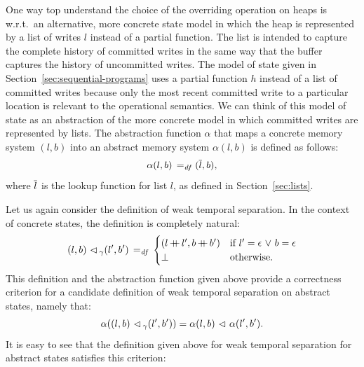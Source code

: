\documentclass[11pt]{report}
\begin{document}
One way top understand the choice of the overriding operation on heaps is w.r.t.\ an alternative, more concrete state model in which the heap is represented by a list of writes $l$ instead of a partial function. The list is intended to capture the complete history of committed writes in the same way that the buffer captures the history of uncommitted writes. The model of state given in Section~\ref{sec:sequential-programs} uses a partial function $h$ instead of a list of committed writes because only the most recent committed write to a particular location is relevant to the operational semantics. We can think of this model of state as an abstraction of the more concrete model in which committed writes are represented by lists. The abstraction function $\alpha$ that maps a concrete memory system $(l,b)$ into an abstract memory system $\alpha(l,b)$ is defined as follows:  \[ \alpha(l,b) \operatorname{\;=_{\mathit{df}}\;} (\overline{l},b),\] where $\overline{l}$ is the lookup function for list $l$, as defined in Section~\ref{sec:lists}. 

Let us again consider the definition of weak temporal separation. In the context of concrete states, the definition is completely natural: \[ (l,b) \operatorname{\,\vartriangleleft\,}_\gamma (l',b') \operatorname{\;=_{\mathit{df}}\;} \begin{cases}
(l \operatorname{+\!\!\!+} l', b \operatorname{+\!\!\!+} b') & \text{if $l' = \epsilon \operatorname{\,\vee\,} b = \epsilon$} \\
\bot & \text{otherwise.}
\end{cases} \] This definition and the abstraction function given above provide a correctness criterion for a candidate definition of weak temporal separation on abstract states, namely that: \[ \alpha((l,b) \operatorname{\,\vartriangleleft\,}_\gamma (l',b')) = \alpha(l,b) \operatorname{\,\vartriangleleft\,} \alpha(l',b').\] It is easy to see that the definition given above for weak temporal separation for abstract states satisfies this criterion: 
\end{document}
